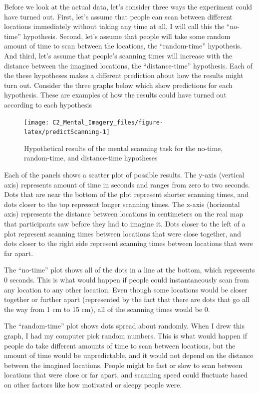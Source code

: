 \documentclass[
  oneside,
  12pt]{crumpbook}
\begin{document}
Before we look at the actual data, let's consider three ways the experiment could have turned out. First, let's assume that people can scan between different locations immediately without taking any time at all, I will call this the ``no-time'' hypothesis. Second, let's assume that people will take some random amount of time to scan between the locations, the ``random-time'' hypothesis. And third, let's assume that people's scanning times will increase with the distance between the imagined locations, the ``distance-time'' hypothesis. Each of the these hypotheses makes a different prediction about how the results might turn out. Consider the three graphs below which show predictions for each hypothesis. These are examples of how the results could have turned out according to each hypothesis

\begin{figure}
\texttt{[image: C2\_Mental\_Imagery\_files/figure-latex/predictScanning-1]} \caption{Hypothetical results of the mental scanning task for the no-time, random-time, and distance-time hypotheses}\label{fig:predictScanning}
\end{figure}

Each of the panels shows a scatter plot of possible results. The y-axis (vertical axis) represents amount of time in seconds and ranges from zero to two seconds. Dots that are near the bottom of the plot represent shorter scanning times, and dots closer to the top represent longer scanning times. The x-axis (horizontal axis) represents the distance between locations in centimeters on the real map that participants saw before they had to imagine it. Dots closer to the left of a plot represent scanning times between locations that were close together, and dots closer to the right side represent scanning times between locations that were far apart.

The ``no-time'' plot shows all of the dots in a line at the bottom, which represents 0 seconds. This is what would happen if people could instantaneously scan from any location to any other location. Even though some locations would be closer together or further apart (represented by the fact that there are dots that go all the way from 1 cm to 15 cm), all of the scanning times would be 0.

The ``random-time'' plot shows dots spread about randomly. When I drew this graph, I had my computer pick random numbers. This is what would happen if people do take different amounts of time to scan between locations, but the amount of time would be unpredictable, and it would not depend on the distance between the imagined locations. People might be fast or slow to scan between locations that were close or far apart, and scanning speed could fluctuate based on other factors like how motivated or sleepy people were.
\end{document}

